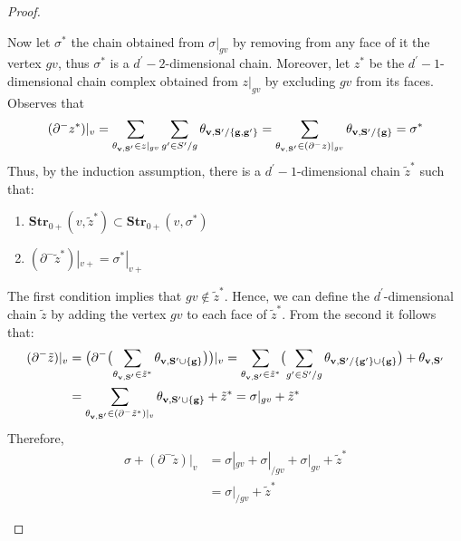 \begin{proof}
\begin{enumerate}
      Now let $ \sigma^{*}$ the chain obtained from $\sigma|_{gv}$ by removing from any face of it the vertex $gv$, thus $\sigma^{*}$ is a $d^{\prime}-2$-dimensional chain. Moreover, let $z^{*}$ be the $d^{\prime}-1$-dimensional chain complex obtained from $z|_{gv}$ by excluding $gv$ from its faces. Observes that 
      \begin{equation*}
        \begin{split}
          (\partial^{-} z^{*})|_{v} =  \sum_{\mathbf{\theta_{v ,S^{\prime}}{} } \in z|_{gv}}\sum_{g^{\prime} \in S^{\prime}/g}\mathbf{\theta_{v ,S^{\prime}/\{g,g^{\prime}\}} } = \sum_{\mathbf{\theta_{v ,S^{\prime}}{} } \in (\partial^{-} z)|_{gv}}\mathbf{\theta_{v ,S^{\prime}/\{g\}} } = \sigma^{*}
        \end{split}
      \end{equation*}
      Thus, by the induction assumption, there is a $d^{\prime}-1$-dimensional chain $\tilde{z}^{*}$ such that: 
  \begin{enumerate}
    \item $ \mathbf{Str}_{0+}(v, \tilde{z}^{*}) \subset \mathbf{Str}_{0+}(v, \sigma^{*})$  
    \item $(\partial^{-}\tilde{z}^{*})|_{v+} = \sigma^{*}|_{v+}$
  \end{enumerate}
The first condition implies that $gv \notin \tilde{z}^{*}$. Hence, we can define the $d^{\prime}$-dimensional chain $\tilde{z}$ by adding the vertex $gv$ to each face of $\tilde{z}^{*}$. From the second it follows that: 
\begin{equation*}
  \begin{split}
    (\partial^{-} \tilde{z})|_{v} &= \bigl(\partial^{-} \bigl(  \sum_{\mathbf{\theta_{v ,S^{\prime}}{} } \in \tilde{z}^{*} } \mathbf{\theta_{v ,S^{\prime}\cup \{g\}} }  \bigr)\bigr)|_{v} =  \sum_{\mathbf{\theta_{v ,S^{\prime}}{} } \in \tilde{z}^{*} } \bigl( \sum_{g^{\prime} \in S^{\prime}/g } \mathbf{\theta_{v ,S^{\prime} / \{g^{\prime}\} \cup \{g\}} } \bigr) +   \mathbf{\theta_{v ,S^{\prime}} } \\
    &=  \sum_{\mathbf{\theta_{v ,S^{\prime}}{} } \in (\partial^{-}\tilde{z}^{*})|_{v} } \mathbf{\theta_{v ,S^{\prime}\cup \{g\}} } + \tilde{z}^{*} = \sigma|_{gv} + \tilde{z}^{*} 
  \end{split}
\end{equation*}
Therefore, 
\begin{equation*}
  \begin{split}
    \sigma + (\partial^{-} \tilde{z})|_{v} &= \sigma|_{gv} + \sigma|_{/ gv} + \sigma|_{gv} + \tilde{z}^{*} \\ 
    &= \sigma|_{/ gv} + \tilde{z}^{*}
  \end{split}
\end{equation*}

\end{enumerate}
\end{proof}
